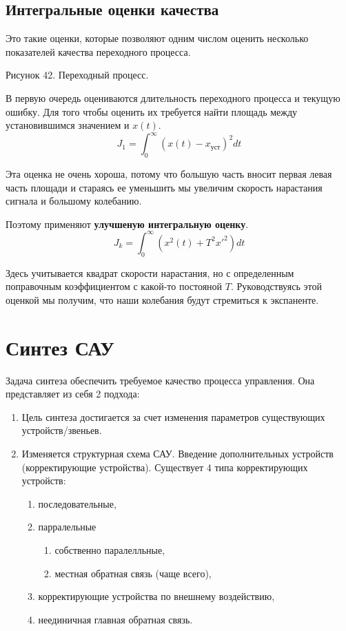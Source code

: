 \subsection{Интегральные оценки качества}
Это такие оценки, которые позволяют одним числом оценить несколько показателей качества переходного процесса.

Рисунок 42. Переходный процесс.

В первую очередь оцениваются длительность переходного процесса и текущую ошибку. Для того чтобы оценить их требуется найти площадь между установившимся значением и $x(t)$.
$$
	J_1=\int^{\infty}_0(x(t)-x_{\text{уст}})^2dt
$$

Эта оценка не очень хороша, потому что большую часть вносит первая левая часть площади и стараясь ее уменьшить мы увеличим скорость нарастания сигнала и большому колебанию.

Поэтому применяют \textbf{улучшеную интегральную оценку}.
$$
	J_k=\int^{\infty}_0(x^2(t)+T^2{}{x'}^2)dt
$$

Здесь учитывается квадрат скорости нарастания, но с определенным поправочным коэффициентом с какой-то постояной $T$. Руководствуясь этой оценкой мы получим, что наши колебания будут стремиться к экспаненте.
\section{Синтез САУ}
Задача синтеза обеспечить требуемое качество процесса управления. Она представляет из себя 2 подхода:
\begin{enumerate}
	\item Цель синтеза достигается за счет изменения параметров существующих устройств/звеньев.
	\item Изменяется структурная схема САУ. Введение дополнительных устройств (корректирующие устройства). Существует 4 типа корректирующих устройств:
		\begin{enumerate}
			\item последовательные,
			\item парралельные
				\begin{enumerate}
					\item собственно паралелльные,
					\item местная обратная связь (чаще всего),
				\end{enumerate}
			\item корректирующие устройства по внешнему воздействию,
			\item неединичная главная обратная связь.
		\end{enumerate}
\end{enumerate}

